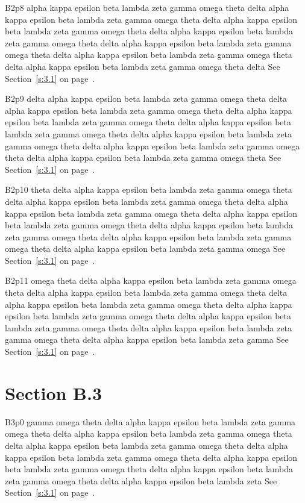 B2p8 alpha kappa epsilon beta lambda zeta gamma omega theta delta alpha kappa epsilon beta lambda zeta gamma omega theta delta alpha kappa epsilon beta lambda zeta gamma omega theta delta alpha kappa epsilon beta lambda zeta gamma omega theta delta alpha kappa epsilon beta lambda zeta gamma omega theta delta alpha kappa epsilon beta lambda zeta gamma omega theta delta alpha kappa epsilon beta lambda zeta gamma omega theta delta See Section~\ref{s:3.1} on page~\pageref{s:3.1}.

B2p9 delta alpha kappa epsilon beta lambda zeta gamma omega theta delta alpha kappa epsilon beta lambda zeta gamma omega theta delta alpha kappa epsilon beta lambda zeta gamma omega theta delta alpha kappa epsilon beta lambda zeta gamma omega theta delta alpha kappa epsilon beta lambda zeta gamma omega theta delta alpha kappa epsilon beta lambda zeta gamma omega theta delta alpha kappa epsilon beta lambda zeta gamma omega theta See Section~\ref{s:3.1} on page~\pageref{s:3.1}.

B2p10 theta delta alpha kappa epsilon beta lambda zeta gamma omega theta delta alpha kappa epsilon beta lambda zeta gamma omega theta delta alpha kappa epsilon beta lambda zeta gamma omega theta delta alpha kappa epsilon beta lambda zeta gamma omega theta delta alpha kappa epsilon beta lambda zeta gamma omega theta delta alpha kappa epsilon beta lambda zeta gamma omega theta delta alpha kappa epsilon beta lambda zeta gamma omega See Section~\ref{s:3.1} on page~\pageref{s:3.1}.

B2p11 omega theta delta alpha kappa epsilon beta lambda zeta gamma omega theta delta alpha kappa epsilon beta lambda zeta gamma omega theta delta alpha kappa epsilon beta lambda zeta gamma omega theta delta alpha kappa epsilon beta lambda zeta gamma omega theta delta alpha kappa epsilon beta lambda zeta gamma omega theta delta alpha kappa epsilon beta lambda zeta gamma omega theta delta alpha kappa epsilon beta lambda zeta gamma See Section~\ref{s:3.1} on page~\pageref{s:3.1}.

\section{Section B.3}\label{s:B.3}
B3p0 gamma omega theta delta alpha kappa epsilon beta lambda zeta gamma omega theta delta alpha kappa epsilon beta lambda zeta gamma omega theta delta alpha kappa epsilon beta lambda zeta gamma omega theta delta alpha kappa epsilon beta lambda zeta gamma omega theta delta alpha kappa epsilon beta lambda zeta gamma omega theta delta alpha kappa epsilon beta lambda zeta gamma omega theta delta alpha kappa epsilon beta lambda zeta See Section~\ref{s:3.1} on page~\pageref{s:3.1}.

